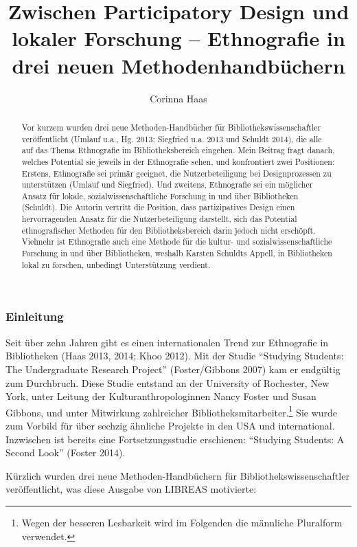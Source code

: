 \documentclass[a4paper,
fontsize=11pt,
oneside,
numbers=noperiodatend,
parskip=half-,
bibliography=totoc,
final
]{scrartcl}
\title{\LARGE{Zwischen Participatory Design und lokaler Forschung – Ethnografie in drei neuen Methodenhandbüchern}} %
\author{Corinna Haas} %
\date{}
\begin{document}
\maketitle
\thispagestyle{fancyplain} 

\begin{abstract}
Vor kurzem wurden drei neue Methoden-Handbücher für
Bibliothekswissenschaftler veröffentlicht (Umlauf u.a., Hg. 2013;
Siegfried u.a. 2013 und Schuldt 2014), die alle auf das Thema
Ethnografie im Bibliotheksbereich eingehen. Mein Beitrag fragt danach,
welches Potential sie jeweils in der Ethnografie sehen, und konfrontiert
zwei Positionen: Erstens, Ethnografie sei primär geeignet, die
Nutzerbeteiligung bei Designprozessen zu unterstützen (Umlauf und
Siegfried). Und zweitens, Ethnografie sei ein möglicher Ansatz für
lokale, sozialwissenschaftliche Forschung in und über Bibliotheken
(Schuldt). Die Autorin vertritt die Position, dass partizipatives Design
einen hervorragenden Ansatz für die Nutzerbeteiligung darstellt, sich
das Potential ethnografischer Methoden für den Bibliotheksbereich darin
jedoch nicht erschöpft. Vielmehr ist Ethnografie auch eine Methode für
die kultur- und sozialwissenschaftliche Forschung in und über
Bibliotheken, weshalb Karsten Schuldts Appell, in Bibliotheken lokal zu
forschen, unbedingt Unterstützung verdient.
\end{abstract}

\subsubsection{Einleitung}\label{einleitung}

Seit über zehn Jahren gibt es einen internationalen Trend zur
Ethnografie in Bibliotheken (Haas 2013, 2014; Khoo 2012). Mit der Studie
\enquote{Studying Students: The Undergraduate Research Project}
(Foster/Gibbons 2007) kam er endgültig zum Durchbruch. Diese Studie
entstand an der University of Rochester, New York, unter Leitung der
Kulturanthropologinnen Nancy Foster und Susan Gibbons, und unter
Mitwirkung zahlreicher Bibliotheksmitarbeiter.\footnote{Wegen der
  besseren Lesbarkeit wird im Folgenden die männliche Pluralform
  verwendet.} Sie wurde zum Vorbild für über sechzig ähnliche Projekte
in den USA und international. Inzwischen ist bereits eine
Fortsetzungsstudie erschienen: \enquote{Studying Students: A Second
Look} (Foster 2014).

Kürzlich wurden drei neue Methoden-Handbüchern für
Bibliothekswissenschaftler veröffentlicht, was diese Ausgabe von LIBREAS
motivierte:
\end{document}
